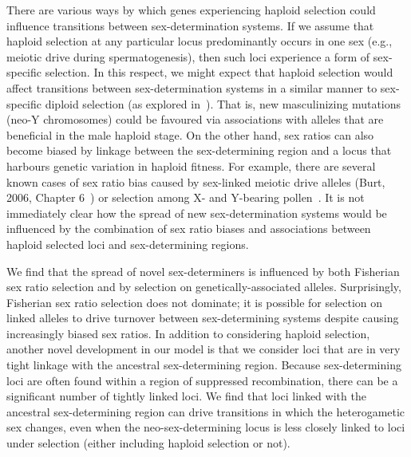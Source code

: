 \documentclass[10pt,letterpaper]{article}
\begin{document}
There are various ways by which genes experiencing haploid selection could influence transitions between sex-determination systems. 
If we assume that haploid selection at any particular locus predominantly occurs in one sex (e.g., meiotic drive during spermatogenesis), then such loci experience a form of sex-specific selection. 
In this respect, we might expect that haploid selection would affect transitions between sex-determination systems in a similar manner to sex-specific diploid selection (as explored in~\cite{vanDoorn:2007eu,vanDoorn:2010hu}). 
That is, new masculinizing mutations (neo-Y chromosomes) could be favoured via associations with alleles that are beneficial in the male haploid stage. 
On the other hand, sex ratios can also become biased by linkage between the sex-determining region and a locus that harbours genetic variation in haploid fitness. 
For example, there are several known cases of sex ratio bias caused by sex-linked meiotic drive alleles (Burt, 2006, Chapter 6~\cite{Burt:2006}) or selection among X- and Y-bearing pollen~\cite{Lloyd:1974tz,Conn:1981uw,Stehlik:2005ul,Stehlik:2006to,Field:2012fd,Field:2013cc}. 
It is not immediately clear how the spread of new sex-determination systems would be influenced by the combination of sex ratio biases and associations between haploid selected loci and sex-determining regions. 

We find that the spread of novel sex-determiners is influenced by both Fisherian sex ratio selection and by selection on genetically-associated alleles. 
Surprisingly, Fisherian sex ratio selection does not dominate; it is possible for selection on linked alleles to drive turnover between sex-determining systems despite causing increasingly biased sex ratios. 
In addition to considering haploid selection, another novel development in our model is that we consider loci that are in very tight linkage with the ancestral sex-determining region. 
Because sex-determining loci are often found within a region of suppressed recombination, there can be a significant number of tightly linked loci. 
We find that loci linked with the ancestral sex-determining region can drive transitions in which the heterogametic sex changes, even when the neo-sex-determining locus is less closely linked to loci under selection (either including haploid selection or not). 
\end{document}
